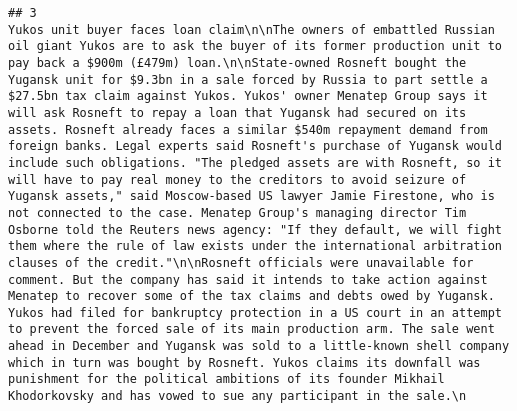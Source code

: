 \documentclass[
]{article}
\begin{document}
\begin{verbatim}
## 3                                                                                                                                                                                                                                                                                                                                                                                                                                                                                                                                                                                                                                                                                                                                                                                                                                                                                                                                                                                                                                                     Yukos unit buyer faces loan claim\n\nThe owners of embattled Russian oil giant Yukos are to ask the buyer of its former production unit to pay back a $900m (£479m) loan.\n\nState-owned Rosneft bought the Yugansk unit for $9.3bn in a sale forced by Russia to part settle a $27.5bn tax claim against Yukos. Yukos' owner Menatep Group says it will ask Rosneft to repay a loan that Yugansk had secured on its assets. Rosneft already faces a similar $540m repayment demand from foreign banks. Legal experts said Rosneft's purchase of Yugansk would include such obligations. "The pledged assets are with Rosneft, so it will have to pay real money to the creditors to avoid seizure of Yugansk assets," said Moscow-based US lawyer Jamie Firestone, who is not connected to the case. Menatep Group's managing director Tim Osborne told the Reuters news agency: "If they default, we will fight them where the rule of law exists under the international arbitration clauses of the credit."\n\nRosneft officials were unavailable for comment. But the company has said it intends to take action against Menatep to recover some of the tax claims and debts owed by Yugansk. Yukos had filed for bankruptcy protection in a US court in an attempt to prevent the forced sale of its main production arm. The sale went ahead in December and Yugansk was sold to a little-known shell company which in turn was bought by Rosneft. Yukos claims its downfall was punishment for the political ambitions of its founder Mikhail Khodorkovsky and has vowed to sue any participant in the sale.\n

\end{verbatim}
\end{document}
